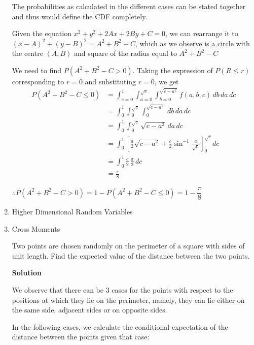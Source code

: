 \documentclass[12pt, oneside]{article}
\begin{document}
\begin{enumerate}
{    The probabilities as calculated in the different cases can be stated together and
    thus would define the CDF completely.

    Given the equation \(x^2 + y^2 + 2Ax + 2By + C = 0\), we can rearrange it to
    \((x - A)^2 + (y - B)^2 = A^2 + B^2 - C\), which as we observe is a circle with the
    centre \((A, B)\) and square of the radius equal to \(A^2 + B^2 - C\)

    We need to find \(P(A^2 + B^2 - C > 0)\). Taking the expression of \(P(R \leq r)\)
    corresponding to \(r = 0\) and substituting \(r = 0\), we get
    \begin{align*}
        P(A^2 + B^2 - C \leq 0) &= \int_{c = 0}^{1} \int_{a=0}^{\sqrt{c}} 
                                    \int_{b = 0}^{\sqrt{c - a^2}} f(a, b, c)\, db\, da\, dc \\
                                &= \int_{0}^{1} \int_{0}^{\sqrt{c}} 
                                \int_{0}^{\sqrt{c - a^2}} \, db\, da\, dc \\
                                &= \int_{0}^{1} \int_{0}^{\sqrt{c}} \sqrt{c - a^2}\, da\, dc \\
                                &= \int_{0}^{1} \left[\frac{a}{2}\sqrt{c - a^2} + \frac{c}{2}
                                    \sin^{-1}{\frac{a}{\sqrt{c}}}\right]^{\sqrt{c}}_{0} dc \\
                                &= \int_{0}^{1} \frac{c}{2} \, \frac{\pi}{2} \, dc \\
                                &= \frac{\pi}{8}
    \end{align*}

    \(\therefore P(A^2 + B^2 - C > 0) = 1 - P(A^2 + B^2 - C \leq 0) = 1 - \dfrac{\pi}{8}\)
}

\item Higher Dimensional Random Variables

\item {
    Cross Moments

    Two points are chosen randomly on the perimeter of a square with sides of unit length.
    Find the expected value of the distance between the two points.

    \textbf{Solution}

    We observe that there can be 3 cases for the points with respect to the positions at
    which they lie on the perimeter, namely, they can lie either on the same side, adjacent
    sides or on opposite sides.

    In the following cases, we calculate the conditional expectation of the distance between
    the points given that case:

}
\end{enumerate}
\end{document}
